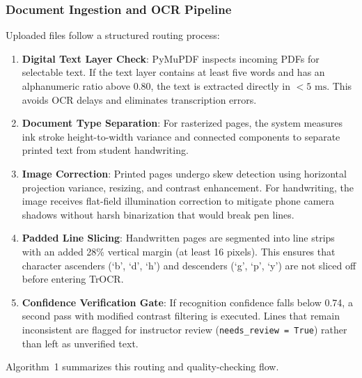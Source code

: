 \documentclass[conference]{IEEEtran}
\begin{document}
\subsubsection{Document Ingestion and OCR Pipeline}
Uploaded files follow a structured routing process:
\begin{enumerate}
    \item \textbf{Digital Text Layer Check}: PyMuPDF inspects incoming PDFs for selectable text. If the text layer contains at least five words and has an alphanumeric ratio above 0.80, the text is extracted directly in $<5\text{ ms}$. This avoids OCR delays and eliminates transcription errors.
    \item \textbf{Document Type Separation}: For rasterized pages, the system measures ink stroke height-to-width variance and connected components to separate printed text from student handwriting.
    \item \textbf{Image Correction}: Printed pages undergo skew detection using horizontal projection variance, resizing, and contrast enhancement. For handwriting, the image receives flat-field illumination correction to mitigate phone camera shadows without harsh binarization that would break pen lines.
    \item \textbf{Padded Line Slicing}: Handwritten pages are segmented into line strips with an added 28\% vertical margin (at least 16 pixels). This ensures that character ascenders (`b', `d', `h') and descenders (`g', `p', `y') are not sliced off before entering TrOCR.
    \item \textbf{Confidence Verification Gate}: If recognition confidence falls below 0.74, a second pass with modified contrast filtering is executed. Lines that remain inconsistent are flagged for instructor review (\texttt{needs\_review = True}) rather than left as unverified text.
\end{enumerate}

Algorithm~1 summarizes this routing and quality-checking flow.
\end{document}
